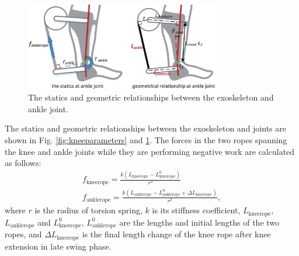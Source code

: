 \documentclass[10pt]{asme2ej}
\begin{document}
\begin{figure}[t]
	\centering
	\includegraphics[width=8.5cm]{ankleparameters.eps}
	\caption{The statics and geometric relationships between the exoskeleton and ankle joint.}
	\label{fig:ankleparameters}
\end{figure}


The statics and geometric relationships between the exoskeleton and joints are shown in Fig. \ref{fig:kneeparameters} and \ref{fig:ankleparameters}.
The forces in the two ropes spanning the knee and ankle joints while they are performing negative work are calculated as follows:
\begin{gather}
	f_\mathrm{kneerope} = \frac{k(L_\mathrm{kneerope}-L_\mathrm{kneerope}^0)}{r^2} \\
	f_\mathrm{anklerope} = \frac{k(L_\mathrm{anklerope}-L_\mathrm{anklerope}^0+\Delta L_\mathrm{kneerope})}{r^2},
\end{gather}
where $r$ is the radius of torsion spring, $k$ is its stiffness coefficient, $L_\mathrm{kneerope}$, $L_\mathrm{anklerope}$ and $L_\mathrm{kneerope}^0$, $L_\mathrm{anklerope}^0$ are the lengths and initial lengths of the two ropes, and $\Delta L_\mathrm{kneerope}$ is the final length change of the knee rope after knee extension in late swing phase.
\end{document}
